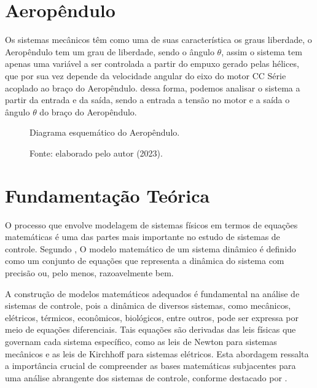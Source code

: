 \section{Aeropêndulo}
Os sistemas mecânicos têm como uma de suas característica os graus liberdade, o Aeropêndulo tem um grau de liberdade, sendo o ângulo $\theta$, assim o sistema tem apenas uma variável a ser controlada a partir do empuxo gerado pelas hélices, que por sua vez depende da velocidade angular do eixo do motor CC Série acoplado ao braço do Aeropêndulo. dessa forma, podemos analisar o sistema a partir da entrada e da saída, sendo a entrada a tensão no motor e a saída o ângulo $\theta$ do braço do Aeropêndulo.

\begin{figure}[!h]
	\centering
	\caption{Diagrama esquemático do Aeropêndulo.}
	\caption*{Fonte: elaborado pelo autor (2023).}
        \label{fig4:image_04}
\end{figure}




\section{ Fundamentação Teórica}
\label{fundamentacao_teorica}

O processo que envolve modelagem de sistemas físicos em termos de equações matemáticas é uma das partes mais importante no estudo de sistemas de controle. Segundo , O modelo matemático de um sistema dinâmico é definido como um conjunto de equações que representa a dinâmica do sistema com precisão ou, pelo menos, razoavelmente bem.

A construção de modelos matemáticos adequados é fundamental na análise de sistemas de controle, pois a dinâmica de diversos sistemas, como mecânicos, elétricos, térmicos, econômicos, biológicos, entre outros, pode ser expressa por meio de equações diferenciais. Tais equações são derivadas das leis físicas que governam cada sistema específico, como as leis de Newton para sistemas mecânicos e as leis de Kirchhoff para sistemas elétricos. Esta abordagem ressalta a importância crucial de compreender as bases matemáticas subjacentes para uma análise abrangente dos sistemas de controle, conforme destacado por .
